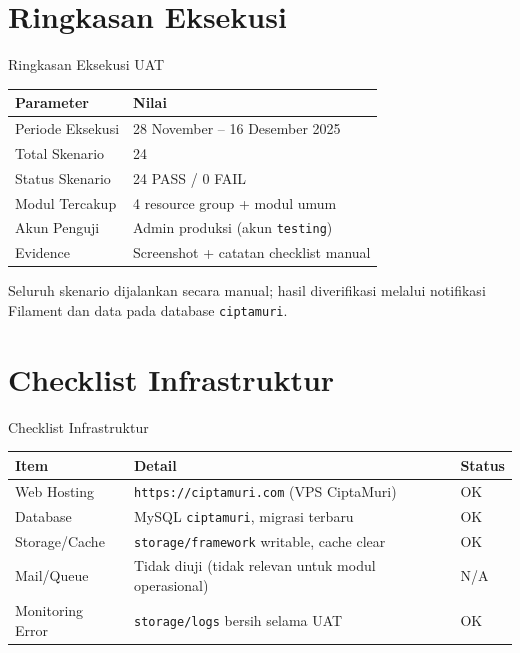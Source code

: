 \documentclass[aspectratio=169]{beamer}
\newcommand{\TotalScenarios}{24}
\newcommand{\PassedScenarios}{24}
\newcommand{\ExecutionWindow}{28 November -- 16 Desember 2025}
\begin{document}
\section{Ringkasan Eksekusi}
\begin{frame}{Ringkasan Eksekusi UAT}
  \begin{tabular}{@{}p{5cm}p{5cm}@{}}
    \toprule
    \textbf{Parameter} & \textbf{Nilai} \\
    \midrule
    Periode Eksekusi & \ExecutionWindow \\
    Total Skenario & \TotalScenarios \\
    Status Skenario & \PassedScenarios{} PASS / 0 FAIL \\
    Modul Tercakup & 4 resource group + modul umum \\
    Akun Penguji & Admin produksi (akun \texttt{testing}) \\
    Evidence & Screenshot + catatan checklist manual \\
    \bottomrule
  \end{tabular}
  \vspace{0.4cm}

  Seluruh skenario dijalankan secara manual; hasil diverifikasi melalui notifikasi Filament dan data pada database \texttt{ciptamuri}.
\end{frame}

\section{Checklist Infrastruktur}
\begin{frame}{Checklist Infrastruktur}
  \begin{tabular}{@{}p{3cm}p{5cm}p{3cm}@{}}
    \toprule
    \textbf{Item} & \textbf{Detail} & \textbf{Status} \\
    \midrule
    Web Hosting & \texttt{https://ciptamuri.com} (VPS CiptaMuri) & OK \\
    Database & MySQL \texttt{ciptamuri}, migrasi terbaru & OK \\
    Storage/Cache & \texttt{storage/framework} writable, cache clear & OK \\
    Mail/Queue & Tidak diuji (tidak relevan untuk modul operasional) & N/A \\
    Monitoring Error & \texttt{storage/logs} bersih selama UAT & OK \\
    \bottomrule
  \end{tabular}
\end{frame}
\end{document}
